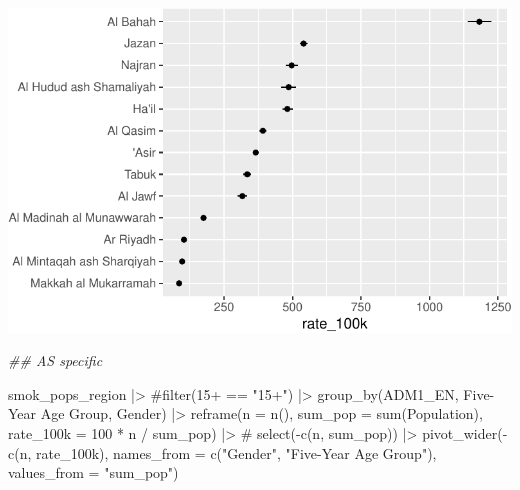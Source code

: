 \documentclass[
  letterpaper,
  DIV=11,
  numbers=noendperiod]{scrreprt}
\newenvironment{Shaded}{\begin{snugshade}}{\end{snugshade}}
\newcommand{\AttributeTok}[1]{\textcolor[rgb]{0.40,0.45,0.13}{#1}}
\newcommand{\CommentTok}[1]{\textcolor[rgb]{0.37,0.37,0.37}{#1}}
\newcommand{\DecValTok}[1]{\textcolor[rgb]{0.68,0.00,0.00}{#1}}
\newcommand{\DocumentationTok}[1]{\textcolor[rgb]{0.37,0.37,0.37}{\textit{#1}}}
\newcommand{\FunctionTok}[1]{\textcolor[rgb]{0.28,0.35,0.67}{#1}}
\newcommand{\NormalTok}[1]{\textcolor[rgb]{0.00,0.23,0.31}{#1}}
\newcommand{\SpecialCharTok}[1]{\textcolor[rgb]{0.37,0.37,0.37}{#1}}
\newcommand{\StringTok}[1]{\textcolor[rgb]{0.13,0.47,0.30}{#1}}
\begin{document}
\includegraphics{lookups_files/figure-pdf/calculate smoking rates by region-2.pdf}

\begin{Shaded}
\begin{Highlighting}[]
\DocumentationTok{\#\# AS specific}

\NormalTok{smok\_pops\_region }\SpecialCharTok{|\textgreater{}}
    \CommentTok{\#filter(\textasciigrave{}15+\textasciigrave{} == "15+") |\textgreater{}}
    \FunctionTok{group\_by}\NormalTok{(ADM1\_EN, }\StringTok{\textasciigrave{}}\AttributeTok{Five{-}Year Age Group}\StringTok{\textasciigrave{}}\NormalTok{, Gender) }\SpecialCharTok{|\textgreater{}}
    \FunctionTok{reframe}\NormalTok{(}\AttributeTok{n =} \FunctionTok{n}\NormalTok{(), }
            \AttributeTok{sum\_pop =} \FunctionTok{sum}\NormalTok{(Population), }
            \AttributeTok{rate\_100k =} \DecValTok{100} \SpecialCharTok{*}\NormalTok{ n }\SpecialCharTok{/}\NormalTok{ sum\_pop) }\SpecialCharTok{|\textgreater{}}
   \CommentTok{\# select({-}c(n, sum\_pop)) |\textgreater{}}
    \FunctionTok{pivot\_wider}\NormalTok{(}\SpecialCharTok{{-}}\FunctionTok{c}\NormalTok{(n, rate\_100k), }\AttributeTok{names\_from =} \FunctionTok{c}\NormalTok{(}\StringTok{"Gender"}\NormalTok{, }\StringTok{"Five{-}Year Age Group"}\NormalTok{), }\AttributeTok{values\_from =} \StringTok{"sum\_pop"}\NormalTok{) }
\end{Highlighting}
\end{Shaded}
\end{document}
